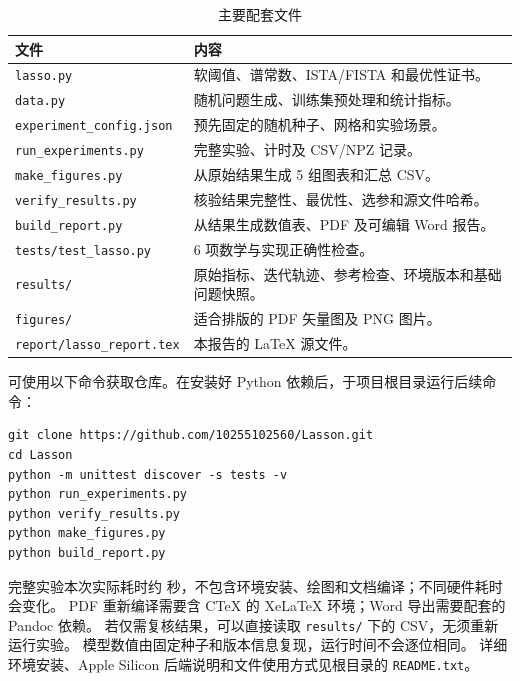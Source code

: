 \documentclass[UTF8,11pt,a4paper,fontset=fandol]{ctexart}
\begin{document}
\begin{table}[htbp]\centering\small
\caption{主要配套文件}
\begin{tabular}{p{5cm}p{7.9cm}}
\toprule 文件 & 内容\\\midrule
\texttt{lasso.py} & 软阈值、谱常数、ISTA/FISTA 和最优性证书。\\
\texttt{data.py} & 随机问题生成、训练集预处理和统计指标。\\
\texttt{experiment\_config.json} & 预先固定的随机种子、网格和实验场景。\\
\texttt{run\_experiments.py} & 完整实验、计时及 CSV/NPZ 记录。\\
\texttt{make\_figures.py} & 从原始结果生成 5 组图表和汇总 CSV。\\
\texttt{verify\_results.py} & 核验结果完整性、最优性、选参和源文件哈希。\\
\texttt{build\_report.py} & 从结果生成数值表、PDF 及可编辑 Word 报告。\\
\texttt{tests/test\_lasso.py} & 6 项数学与实现正确性检查。\\
\texttt{results/} & 原始指标、迭代轨迹、参考检查、环境版本和基础问题快照。\\
\texttt{figures/} & 适合排版的 PDF 矢量图及 PNG 图片。\\
\texttt{report/lasso\_report.tex} & 本报告的 LaTeX 源文件。\\
\bottomrule\end{tabular}\end{table}

可使用以下命令获取仓库。在安装好 Python 依赖后，于项目根目录运行后续命令：
\begin{verbatim}
git clone https://github.com/10255102560/Lasson.git
cd Lasson
python -m unittest discover -s tests -v
python run_experiments.py
python verify_results.py
python make_figures.py
python build_report.py
\end{verbatim}
完整实验本次实际耗时约 \TotalSeconds{} 秒，不包含环境安装、绘图和文档编译；不同硬件耗时会变化。
PDF 重新编译需要含 CTeX 的 XeLaTeX 环境；Word 导出需要配套的 Pandoc 依赖。
若仅需复核结果，可以直接读取 \texttt{results/} 下的 CSV，无须重新运行实验。
模型数值由固定种子和版本信息复现，运行时间不会逐位相同。
详细环境安装、Apple Silicon 后端说明和文件使用方式见根目录的 \texttt{README.txt}。
\end{document}

